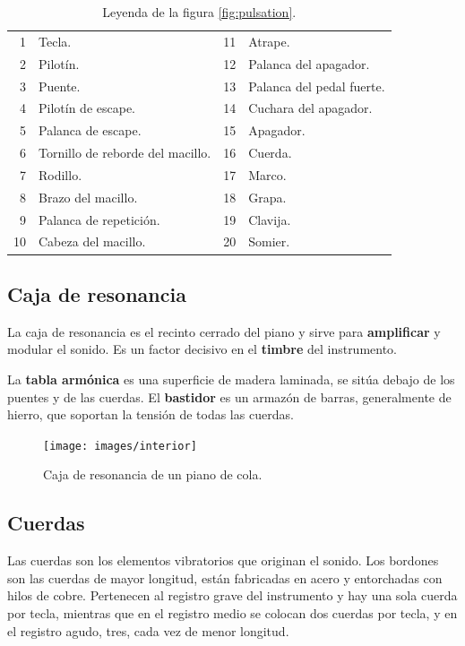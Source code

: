 \documentclass[10pt,a4paper]{article}
\begin{document}
	\begin{table}[!ht]
		\centering
		\begin{tabular}{|r|l||r|l|}
			\hline
			1 & Tecla. & 11 & Atrape. \\
			2 & Pilotín. & 12 & Palanca del apagador. \\
			3 & Puente. & 13 & Palanca del pedal fuerte. \\
			4 & Pilotín de escape. & 14 & Cuchara del apagador. \\
			5 & Palanca de escape. & 15 & Apagador. \\
			6 & Tornillo de reborde del macillo. & 16 & Cuerda. \\
			7 & Rodillo. & 17 & Marco. \\
			8 & Brazo del macillo. & 18 & Grapa. \\
			9 & Palanca de repetición. & 19 & Clavija. \\
			10 & Cabeza del macillo. & 20 & Somier. \\
			\hline
		\end{tabular}
		\caption[Leyenda del mecanismo]{\label{tab:pulsation} Leyenda de la figura \ref{fig:pulsation}.}
	\end{table}
	
	\subsection{Caja de resonancia}
	
	La caja de resonancia es el recinto cerrado del piano y sirve para \textbf
	{amplificar} y modular el sonido. Es un factor decisivo en el \textbf
	{timbre} del instrumento.
	
	La \textbf{tabla armónica} es una superficie de madera laminada, se sitúa 
	debajo de los puentes y de las cuerdas. El \textbf{bastidor} es un armazón 
	de barras, generalmente de hierro, que soportan la tensión de todas las 
	cuerdas.
	
	\begin{figure}[!ht]
		\centering
		\texttt{[image: images/interior]}
		\caption[Caja de resonancia]{\label{fig:interior} Caja de resonancia de un piano de cola.}
	\end{figure}
	
	\subsection{Cuerdas}
	
	Las cuerdas son los elementos vibratorios que originan el sonido. Los 
	bordones son las cuerdas de mayor longitud, están fabricadas en acero y 
	entorchadas con hilos de cobre. Pertenecen al registro grave del 
	instrumento y hay una sola cuerda por tecla, mientras que en el registro 
	medio se colocan dos cuerdas por tecla, y en el registro agudo, tres, cada 
	vez de menor longitud.
	
\end{document}
